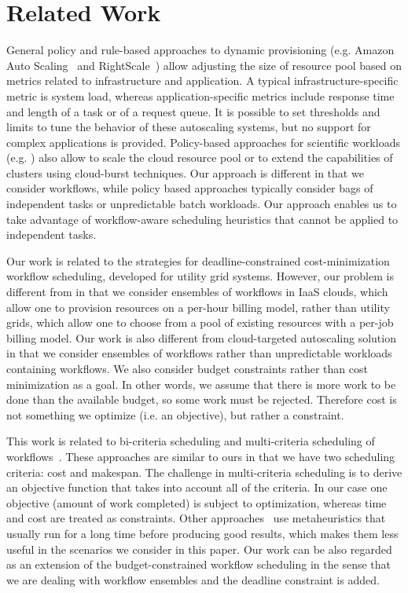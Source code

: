 \documentclass[conference]{IEEEtran}
\begin{document}
\section{Related Work}
\label{sec:related}
General policy and rule-based approaches to dynamic provisioning (e.g. Amazon
Auto Scaling~\cite{Autoscaling} and
RightScale~\cite{RightScale}) allow adjusting the size
of resource pool based on metrics related to infrastructure and application.
A typical infrastruc\-ture-specific metric is system load, whereas
application-speci\-fic metrics include response time and length of a task or
of a request queue. It is possible to set thresholds and limits to tune the behavior
of these autoscaling systems, but no support for complex applications is provided.
Policy-based approaches for scientific workloads (e.g. \cite{Marshall2010,
Kim2011}) also allow to scale the cloud resource pool or to extend the
capabilities of clusters using cloud-burst techniques. Our approach is different
in that we consider workflows, while policy based approaches typically consider
bags of independent tasks or unpredictable batch workloads. Our approach enables us to
take advantage of workflow-aware scheduling heuristics that cannot be applied to
independent tasks.


Our work is related to the strategies for deadline-con\-strained
cost-minimization workflow scheduling, developed for utility grid systems. However, our problem is
different from \cite{Yu2005, Abrishami2010} in that we consider ensembles of workflows in
IaaS clouds, which allow one to provision resources on a per-hour billing model,
rather than utility grids, which allow one to choose from a pool of existing
resources with a per-job billing model. Our work is also different from
cloud-targeted autoscaling solution~\cite{Mao2011} in that we consider ensembles
of workflows rather than unpredictable workloads containing workflows. We also consider budget constraints
rather than cost minimization as a goal. In other words, we assume that there is
more work to be done than the available budget, so some work must be rejected.
Therefore cost is not something we optimize (i.e. an objective), but rather a constraint.


This work is related to bi-criteria scheduling and multi-criteria scheduling of
workflows~\cite{Wieczorek2009,Prodan2010,Dongarra2007}. These approaches are
similar to ours in that we have two scheduling criteria: cost and makespan. The
challenge in multi-criteria scheduling is to derive an objective function that
takes into account all of the criteria. In our case one objective (amount
of work completed) is subject to optimization, whereas time and cost are
treated as constraints. Other approaches~\cite{Talukder2009,Pandey2010} use
metaheuristics that usually run for a long time before producing good results,
which makes them less useful in the scenarios we consider in this paper. Our work can be also
regarded as an extension of the budget-constrained workflow scheduling
\cite{Sakellariou2007} in the sense that we are dealing with workflow ensembles
and the deadline constraint is added.
\end{document}
